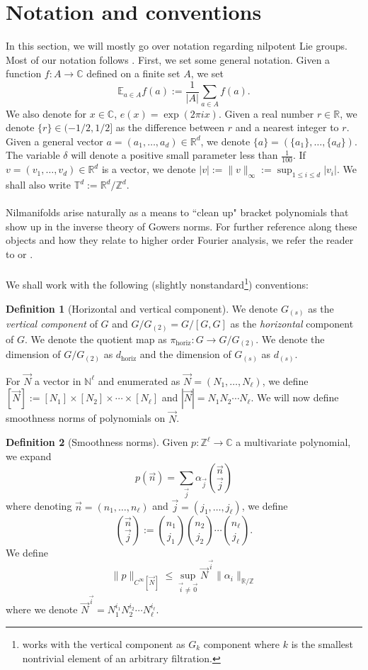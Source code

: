 \documentclass[11pt, a4paper]{amsart}
\theoremstyle{plain}
\theoremstyle{plain}
\theoremstyle{definition}
\newtheorem{definition}{Definition}
\theoremstyle{remark}
\numberwithin{equation}{section}
\numberwithin{lemma}{section}
\numberwithin{proposition}{section}
\numberwithin{corollary}{section}
\numberwithin{definition}{section}
\numberwithin{claim}{section}
\begin{document}
\section{Notation and conventions}\label{s:not}
In this section, we will mostly go over notation regarding nilpotent Lie groups. Most of our notation follows \cite{GT12}. First, we set some general notation. Given a function $f\colon A \to \mathbb{C}$ defined on a finite set $A$, we set
$$\mathbb{E}_{a \in A} f(a) := \frac{1}{|A|} \sum_{a \in A} f(a).$$
We also denote for $x \in \mathbb{C}$, $e(x) = \exp(2\pi i x)$. Given a real number $r \in \mathbb{R}$, we denote $\{r\} \in (-1/2, 1/2]$ as the difference between $r$ and a nearest integer to $r$. Given a general vector $a = (a_1, \dots, a_d) \in \mathbb{R}^d$, we denote $\{a\} = (\{a_1\}, \dots, \{a_d\})$. The variable $\delta$ will denote a positive small parameter less than $\frac{1}{100}$. If $v = (v_1, \dots, v_d) \in \mathbb{R}^d$ is a vector, we denote $|v| := \|v\|_\infty := \sup_{1 \le i \le d} |v_i|$. We shall also write $\mathbb{T}^d := \mathbb{R}^d/\mathbb{Z}^d$. \\\\
Nilmanifolds arise naturally as a means to ``clean up" bracket polynomials that show up in the inverse theory of Gowers norms. For further reference along these objects and how they relate to higher order Fourier analysis, we refer the reader to \cite{Tao12} or \cite{HK18}.\\\\
We shall work with the following (slightly nonstandard\footnote{\cite{GT12} works with the vertical component as $G_k$ component where $k$ is the smallest nontrivial element of an arbitrary filtration.}) conventions:
\begin{definition}[Horizontal and vertical component]
We denote $G_{(s)}$ as the \emph{vertical component} of $G$ and $G/G_{(2)} = G/[G, G]$ as the \emph{horizontal} component of $G$. We denote the quotient map as $\pi_{\mathrm{horiz}}\colon G \to G/G_{(2)}$. We denote the dimension of $G/G_{(2)}$ as $d_{\mathrm{horiz}}$ and the dimension of $G_{(s)}$ as $d_{(s)}$.
\end{definition}
For $\vec{N}$ a vector in $\mathbb{N}^\ell$ and enumerated as $\vec{N} = (N_1, \dots, N_\ell)$, we define $[\vec{N}] := [N_1] \times [N_2] \times \cdots \times [N_\ell]$ and $|\vec{N}| = N_1N_2\cdots N_\ell$. We will now define smoothness norms of polynomials on $\vec{N}$. 
\begin{definition}[Smoothness norms]
Given $p: \mathbb{Z}^\ell \to \mathbb{C}$ a multivariate polynomial, we expand
$$p(\vec{n}) = \sum_{\vec{j}} \alpha_{\vec{j}}\binom{\vec{n}}{\vec{j}}$$
where denoting $\vec{n} = (n_1, \dots, n_\ell)$ and $\vec{j} = (j_1, \dots, j_\ell)$, we define
$$\binom{\vec{n}}{\vec{j}} := \binom{n_1}{j_1}\binom{n_2}{j_2} \cdots \binom{n_\ell}{j_\ell}.$$
We define
$$\|p\|_{C^\infty[\vec{N}]} \le \sup_{\vec{i} \neq \vec{0}} \vec{N}^{\vec{i}} \|\alpha_i\|_{\mathbb{R}/\mathbb{Z}}$$
where we denote $\vec{N}^{\vec{i}} = N_1^{i_1}N_2^{i_2} \cdots N_\ell^{i_\ell}$.
\end{definition}
\end{document}
